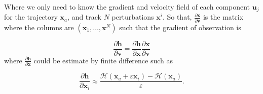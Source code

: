 Where we only need to know the gradient and velocity field of each component $\bm u_j$ for the trajectory $\bm x_a$, and track $N$ perturbations $\bm x^i$. So that, $\frac{\partial \bm x}{\partial \bm v}$ is the matrix where the columns are $(\bm x_1, \dots, \bm x^N)$ such that the gradient of observation is

\begin{equation*}
    \frac{\partial \bm h}{\partial \bm v} = \frac{\partial \bm h}{\partial \bm x} \frac{\partial \bm x}{\partial \bm v}
\end{equation*}where $\frac{\partial \bm h}{\partial \bm x}$ could be estimate by finite difference such as

\begin{equation*}
    \frac{\partial \bm h}{\partial \bm x_i} \approx \frac{\mathcal H(\bm x_a + \varepsilon \bm x_i) - \mathcal H(\bm x_a)}{\varepsilon}.
\end{equation*}

